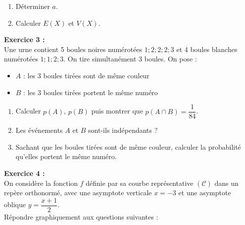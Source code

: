 \begin{enumerate}[leftmargin=1.5em, label=\textbf{\arabic*.}, itemsep=2pt, topsep=4pt]
  \item D\'{e}terminer $a$.
  \item Calculer $E(X)$ et $V(X)$.
\end{enumerate}

\medskip

\noindent\textbf{Exercice 3 :}\\
Une urne contient 5 boules noires num\'{e}rot\'{e}es $1;2;2;2;3$
et 4 boules blanches num\'{e}rot\'{e}es $1;1;2;3$.
On tire simultan\'{e}ment 3 boules. On pose :
\begin{itemize}[itemsep=0pt, topsep=2pt, leftmargin=2em]
  \item $A$ : \guillemotleft{} les 3 boules tir\'{e}es sont de m\^{e}me couleur \guillemotright{}
  \item $B$ : \guillemotleft{} les 3 boules tir\'{e}es portent le m\^{e}me num\'{e}ro \guillemotright{}
\end{itemize}

\begin{enumerate}[leftmargin=1.5em, label=\textbf{\arabic*.}, itemsep=2pt, topsep=4pt]
  \item Calculer $p(A)$, $p(B)$ puis montrer que $p(A \cap B) = \dfrac{1}{84}$.
  \item Les \'{e}v\'{e}nements $A$ et $B$ sont-ils ind\'{e}pendants ?
  \item Sachant que les boules tir\'{e}es sont de m\^{e}me couleur,
        calculer la probabilit\'{e} qu'elles portent le m\^{e}me num\'{e}ro.
\end{enumerate}

\medskip

\noindent\textbf{Exercice 4 :}\\
On consid\`{e}re la fonction $f$ d\'{e}finie par sa courbe repr\'{e}sentative $(\mathcal{C})$
dans un rep\`{e}re orthonorm\'{e}, avec une asymptote verticale $x = -3$
et une asymptote oblique $y = \dfrac{x+1}{2}$.\\
R\'{e}pondre graphiquement aux questions suivantes :


